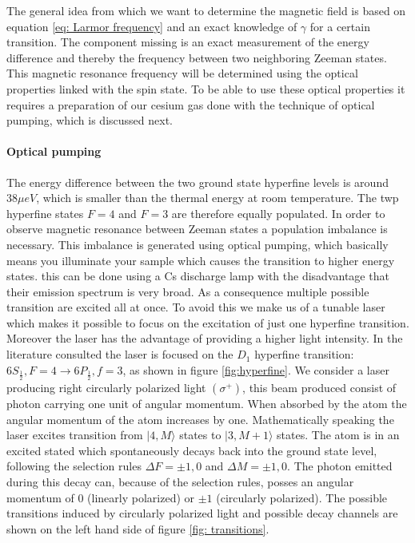 \documentclass[a4paper,kul]{kulakarticle} %
\begin{document}
The general idea from which we want to determine the magnetic field is based on equation \ref{eq: Larmor frequency} and an exact knowledge of $\gamma$ for a certain transition. The component missing is an exact measurement of the energy difference and thereby the frequency between two neighboring Zeeman states. This magnetic resonance frequency will be determined using the optical properties linked with the spin state. To be able to use these optical properties it requires a preparation of our cesium gas done with the technique of optical pumping, which is discussed next.\\

\paragraph{Optical pumping}

The energy difference between the two ground state hyperfine levels is around $38 \mu eV$, which is smaller than the thermal energy at room temperature. The twp hyperfine states $F=4$ and $F=3$ are therefore equally populated. In order to observe magnetic resonance between Zeeman states a population imbalance is necessary. This imbalance is generated using optical pumping, which basically means you illuminate your sample which causes the transition to higher energy states. this can be done using a Cs discharge lamp with the disadvantage that their emission spectrum is very broad. As a consequence multiple possible transition are excited all at once. To avoid this we make us of a tunable laser which makes it possible to focus on the excitation of just one hyperfine transition. Moreover the laser has the advantage of providing a higher light intensity. In the literature consulted the laser is focused on the $D_{1}$ hyperfine transition: $6S_{\frac{1}{2}},F = 4 \rightarrow 6P_{\frac{1}{2}},f = 3$, as shown in figure \ref{fig:hyperfine}. We consider a laser producing right circularly polarized light $(\sigma^{+})$, this beam produced consist of photon carrying one unit of angular momentum. When absorbed by the atom the angular momentum of the atom increases by one. Mathematically speaking the laser excites transition from $|4,M\rangle$ states to $|3,M+1\rangle$ states. The atom is in an excited stated which spontaneously decays back into the ground state level, following the  selection rules $\Delta F = \pm1,0$ and $\Delta M = \pm1, 0$. The photon emitted during this decay can, because of the selection rules, posses an angular momentum of $0$ (linearly polarized) or $\pm 1$ (circularly polarized). The possible transitions induced by circularly polarized light and possible decay channels are shown on the left hand side of figure \ref{fig: transitions}.\\
\end{document}
